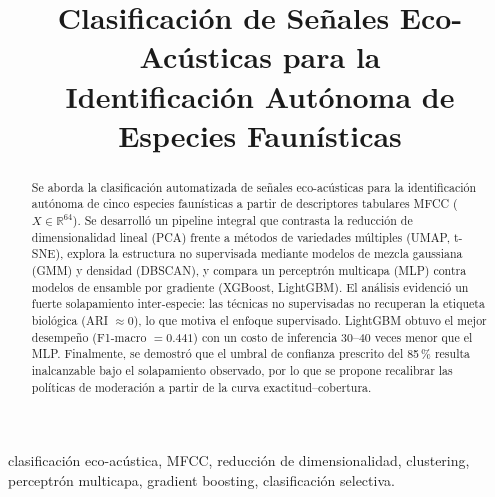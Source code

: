\documentclass[conference]{IEEEtran}
\begin{document}
\title{Clasificación de Señales Eco-Acústicas para la\\
Identificación Autónoma de Especies Faunísticas}

\author{
\and
{}
\and
{}
}

\maketitle

\begin{abstract}
Se aborda la clasificación automatizada de señales eco-acústicas para la
identificación autónoma de cinco especies faunísticas a partir de descriptores
tabulares MFCC ($X \in \mathbb{R}^{64}$). Se desarrolló un pipeline integral que
contrasta la reducción de dimensionalidad lineal (PCA) frente a métodos de
variedades múltiples (UMAP, t-SNE), explora la estructura no supervisada mediante
modelos de mezcla gaussiana (GMM) y densidad (DBSCAN), y compara un perceptrón
multicapa (MLP) contra modelos de ensamble por gradiente (XGBoost, LightGBM). El
análisis evidenció un fuerte solapamiento inter-especie: las técnicas no
supervisadas no recuperan la etiqueta biológica (ARI $\approx 0$), lo que motiva el
enfoque supervisado. LightGBM obtuvo el mejor desempeño (F1-macro $=0{.}441$) con un
costo de inferencia 30--40 veces menor que el MLP. Finalmente, se demostró que el
umbral de confianza prescrito del 85\,\% resulta inalcanzable bajo el solapamiento
observado, por lo que se propone recalibrar las políticas de moderación a partir de
la curva exactitud--cobertura.
\end{abstract}

\begin{IEEEkeywords}
clasificación eco-acústica, MFCC, reducción de dimensionalidad, clustering,
perceptrón multicapa, gradient boosting, clasificación selectiva.
\end{IEEEkeywords}
\end{document}
